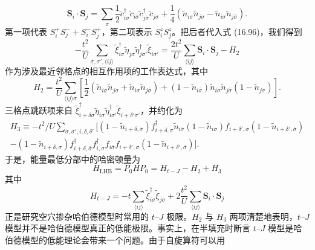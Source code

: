 \begin{equation*}
\mathbf{S}_{i}\cdot\mathbf{S}_{j}=\sum_{\sigma}\frac{1}{2}\tilde{c}^{\dagger}_{i\sigma}\tilde{c}_{i\bar{\sigma}}\tilde{c}^{\dagger}_{j\bar{\sigma}}\tilde{c}_{j\sigma}+\frac{1}{4}(\tilde{n}_{i\sigma}\tilde{n}_{j\sigma}-\tilde{n}_{i\sigma}\tilde{n}_{j\bar{\sigma}}).\tag{16.97}
\end{equation*}
第一项代表 $S^{+}_{i}S^{-}_{j}+S^{-}_{i}S^{+}_{j}$，第二项表示 $S^{z}_{i}S^{z}_{j}$。把后者代入式 (16.96)，我们得到
\begin{equation*}
-\frac{t^{2}}{U}\sum_{\sigma,\sigma',\langle ij\rangle}\tilde{\xi}^{\dagger}_{i\sigma}\tilde{\eta}_{j\sigma}\tilde{\eta}^{\dagger}_{j\sigma'}\tilde{\xi}_{i\sigma'}=\frac{2t^{2}}{U}\sum_{\langle ij\rangle}\mathbf{S}_{i}\cdot\mathbf{S}_{j}-H_{2}\tag{16.98}
\end{equation*}
作为涉及最近邻格点的相互作用项的工作表达式，其中
\begin{equation*}
H_{2}=\frac{t^{2}}{U}\sum_{\langle ij\rangle\sigma}\left[\frac{1}{2}(\tilde{n}_{i\sigma}\tilde{n}_{j\sigma}+\tilde{n}_{i\sigma}\tilde{n}_{j\bar{\sigma}})+(1-\tilde{n}_{i\bar{\sigma}})\tilde{n}_{i\sigma}\tilde{n}_{j\bar{\sigma}}(1-\tilde{n}_{j\sigma})\right].\tag{16.99}
\end{equation*}
三格点跳跃项来自 $\tilde{\xi}^{\dagger}_{i+\delta\sigma}\tilde{\eta}_{i\sigma}\tilde{\eta}^{\dagger}_{i\sigma'}\tilde{\xi}_{i+\delta'\sigma'}$，并约化为
\begin{align*}
H_{3}\equiv-t^{2}/U\sum_{\sigma,\sigma',i,\delta,\delta'}\Big[(1-\tilde{n}_{i+\delta,\bar{\sigma}})f^{\dagger}_{i+\delta,\sigma}\tilde{n}_{i\bar{\sigma}}(1-\tilde{n}_{i\sigma})f_{i+\delta',\sigma}(1-\tilde{n}_{i+\delta',\bar{\sigma}})\\
-(1-\tilde{n}_{i+\delta,\sigma})f^{\dagger}_{i+\delta,\bar{\sigma}}f^{\dagger}_{i,\sigma}f_{i\bar{\sigma}}f_{i+\delta',\sigma}(1-\tilde{n}_{i+\delta',\bar{\sigma}})\Big].\tag{16.100}
\end{align*}
于是，能量最低分部中的哈密顿量为
\begin{equation*}
H_{\mathrm{LHB}}=P_{0}HP_{0}=H_{t-J}-H_{2}+H_{3}\tag{16.101}
\end{equation*}
其中
\begin{equation*}
H_{t-J}=-t\sum_{\langle ij\rangle}\tilde{\xi}^{\dagger}_{i\sigma}\tilde{\xi}_{j\sigma}+2\frac{t^{2}}{U}\sum_{\langle ij\rangle}\mathbf{S}_{i}\cdot\mathbf{S}_{j}\tag{16.102}
\end{equation*}
正是研究空穴掺杂哈伯德模型时常用的 $t$--$J$ 极限。$H_{2}$ 与 $H_{3}$ 两项清楚地表明，$t$--$J$ 模型并不是哈伯德模型真正的低能极限。事实上，在半填充时断言 $t$--$J$ 模型是哈伯德模型的低能理论会带来一个问题。由于自旋算符可以用
